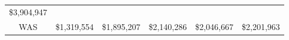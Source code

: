 \documentclass[]{book}
\newenvironment{Shaded}{\begin{snugshade}}{\end{snugshade}}
\newcommand{\DataTypeTok}[1]{\textcolor[rgb]{0.13,0.29,0.53}{#1}}
\newcommand{\DecValTok}[1]{\textcolor[rgb]{0.00,0.00,0.81}{#1}}
\newcommand{\KeywordTok}[1]{\textcolor[rgb]{0.13,0.29,0.53}{\textbf{#1}}}
\newcommand{\NormalTok}[1]{#1}
\newcommand{\OperatorTok}[1]{\textcolor[rgb]{0.81,0.36,0.00}{\textbf{#1}}}
\newcommand{\StringTok}[1]{\textcolor[rgb]{0.31,0.60,0.02}{#1}}
\theoremstyle{definition}
\theoremstyle{definition}
\theoremstyle{definition}
\theoremstyle{remark}
\begin{document}
\begin{longtable}[]{@{}cccccc@{}}
\begin{minipage}[t]{0.15\columnwidth}
\$3,904,947\strut
\end{minipage}\tabularnewline
\begin{minipage}[t]{0.09\columnwidth}\centering
WAS\strut
\end{minipage} & \begin{minipage}[t]{0.15\columnwidth}\centering
\$1,319,554\strut
\end{minipage} & \begin{minipage}[t]{0.15\columnwidth}\centering
\$1,895,207\strut
\end{minipage} & \begin{minipage}[t]{0.15\columnwidth}\centering
\$2,140,286\strut
\end{minipage} & \begin{minipage}[t]{0.15\columnwidth}\centering
\$2,046,667\strut
\end{minipage} & \begin{minipage}[t]{0.15\columnwidth}\centering
\$2,201,963\strut
\end{minipage}\tabularnewline
\bottomrule
\end{longtable}

\begin{Shaded}
\end{Shaded}
\end{document}
